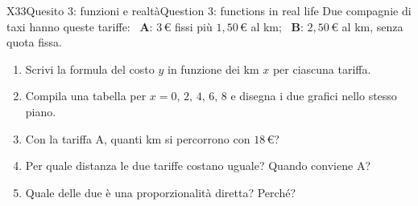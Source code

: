 \begin{esercizio}{X3}{3}{Quesito 3: funzioni e realtà}{Question 3: functions in real life}
Due compagnie di taxi hanno queste tariffe: \ \textbf{A}: $3$\,€ fissi più $1,50$\,€ al km; \ \textbf{B}: $2,50$\,€ al km, senza quota fissa.
\begin{enumerate}
\item Scrivi la formula del costo $y$ in funzione dei km $x$ per ciascuna tariffa. 
\item Compila una tabella per $x=0,\,2,\,4,\,6,\,8$ e disegna i due grafici nello stesso piano. 
\item Con la tariffa A, quanti km si percorrono con $18$\,€? 
\item Per quale distanza le due tariffe costano uguale? Quando conviene A? 
\item Quale delle due è una proporzionalità diretta? Perché? 
\end{enumerate}
\end{esercizio}
